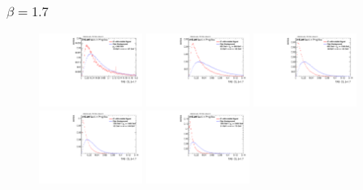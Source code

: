 \subsubsection*{$\beta=1.7$}
\begin{figure}[H]
\includegraphics[width=0.3\textwidth]{sascha_input/Appendix/Distributions/higgs/distributions/beta17/h_assisted_tj_C2_17_bin1.pdf} \hspace{1mm}
\includegraphics[width=0.3\textwidth]{sascha_input/Appendix/Distributions/higgs/distributions/beta17/h_assisted_tj_C2_17_bin2.pdf} \hspace{4mm}
\includegraphics[width=0.3\textwidth]{sascha_input/Appendix/Distributions/higgs/distributions/beta17/h_assisted_tj_C2_17_bin3.pdf} 
\bigskip
\includegraphics[width=0.3\textwidth]{sascha_input/Appendix/Distributions/higgs/distributions/beta17/h_assisted_tj_C2_17_bin4.pdf} \hspace{4mm}
\includegraphics[width=0.3\textwidth]{sascha_input/Appendix/Distributions/higgs/distributions/beta17/h_assisted_tj_C2_17_bin5.pdf} 


\end{figure}
